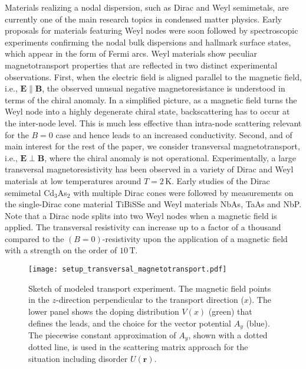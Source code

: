 \documentclass[aps,prb,10pt,amsmath,amssymb,twocolumn,floatfix,superscriptaddress,showpacs,numerical,footinbib]{revtex4-1}
\begin{document}
Materials realizing a nodal dispersion, such as Dirac and Weyl semimetals, are currently one of the main research topics in condensed matter physics.
%
Early proposals for materials featuring Weyl nodes\cite{Wan2011,Weng2015,Huang:2015ig} were soon followed by spectroscopic experiments confirming the nodal bulk dispersions and hallmark surface states, which appear in the form of Fermi arcs.\cite{Xu2015a,Lv2015a,Xu2015,Bernevig2015}
%
Weyl materials show peculiar magnetotransport properties\cite{Hosur2013} that are reflected in two distinct experimental observations.
%
First, when the electric field is aligned parallel to the magnetic field, i.e., $\mathbf{E}\parallel\mathbf{B}$, the observed unusual negative magnetoresistance\cite{Xiong:2015kl,Li:2016bj,Xiong:2016bx,Li:2016hs,Li:2016dp,Zhang:2016cv,Wang:2016hc,Wang:2017eo} is understood in terms of the chiral anomaly.\cite{Nielsen:1983ce,Son2013}
%
In a simplified picture, as a magnetic field turns the Weyl node into a highly degenerate chiral state, backscattering has to occur at the inter-node level.
%
This is much less effective than intra-node scattering relevant for the $B=0$ case and hence leads to an increased conductivity.
%
Second, and of main interest for the rest of the paper, we consider transversal magnetotransport, i.e., $\mathbf{E}\perp\mathbf{B}$, where the chiral anomaly is not operational.
%
Experimentally, a large transversal magnetoresistivity has been observed in a variety of Dirac and Weyl materials at low temperatures around $T=2\,\mathrm{K}$.
%
Early studies of the Dirac semimetal Cd$_{3}$As$_{2}$\cite{Feng2015,Liang2015,Zhao2015,Li:2016bj} with multiple Dirac cones were followed by measurements on the single-Dirac cone material TiBiSSe \cite{Novak2015} and Weyl materials NbAs\cite{Ghimire2015}, TaAs\cite{Huang2015b} and NbP.\cite{Shekhar2015}
%
Note that a Dirac node splits into two Weyl nodes when a magnetic field is applied.
%
The transversal resistivity can increase up to a factor of a thousand compared to the $(B=0)$-resistivity upon the application of a magnetic field with a strength on the order of $10\,\mathrm{T}$.\cite{Novak2015}

\begin{figure}[b]
\texttt{[image: setup\_transversal\_magnetotransport.pdf]}
\caption{\label{fig:setup} Sketch of modeled transport experiment.
%
The magnetic field points in the $z$-direction perpendicular to the transport direction ($x$).
%
The lower panel shows the doping distribution $V(x)$ (green) that defines the leads, and the choice for the vector potential $A_{y}$ (blue).
%
The piecewise constant approximation of $A_{y}$, shown with a dotted dotted line, is used in the scattering matrix approach for the situation including disorder $U(\mathbf{r})$.
}
\end{figure}
\end{document}
